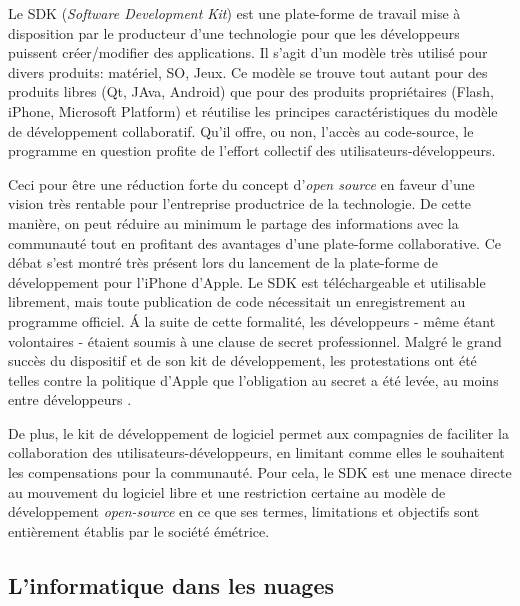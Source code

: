 Le SDK (\emph{Software Development Kit}) est une plate-forme de travail mise à disposition par le producteur d'une technologie pour que les développeurs puissent créer/modifier des applications. Il s'agit d'un modèle très utilisé pour divers produits: matériel, SO, Jeux. Ce modèle se trouve tout autant pour des produits libres (Qt, JAva, Android) que pour des produits propriétaires (Flash, iPhone, Microsoft Platform) et réutilise les principes caractéristiques du modèle de développement collaboratif. Qu'il offre, ou non, l'accès au code-source, le programme en question profite de l'effort collectif des utilisateurs-développeurs.

Ceci pour être une réduction forte du concept d'\emph{open source} en faveur d'une vision très rentable pour l'entreprise productrice de la technologie. De cette manière, on peut réduire au minimum le partage des informations avec la communauté tout en profitant des avantages d'une plate-forme collaborative. Ce débat s'est montré très présent lors du lancement de la plate-forme de développement pour l'iPhone d'Apple. Le SDK est téléchargeable et utilisable librement, mais toute publication de code nécessitait un enregistrement au programme officiel. \'A la suite de cette formalité, les développeurs - même étant volontaires - étaient soumis à une clause de secret professionnel. Malgré le grand succès du dispositif et de son kit de développement, les protestations ont été telles contre la politique d'Apple que l'obligation au secret a été levée, au moins entre développeurs \citep{Willis2008}.

De plus, le kit de développement de logiciel permet aux compagnies de faciliter la collaboration des utilisateurs-développeurs, en limitant comme elles le souhaitent les compensations pour la communauté. Pour cela, le SDK est une menace directe au mouvement du logiciel libre et une restriction certaine au modèle de développement \emph{open-source} en ce que ses termes, limitations et objectifs sont entièrement établis par le société émétrice.

\subsection{L'informatique dans les nuages} \label{1.4.2}

